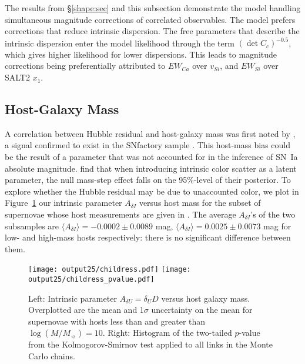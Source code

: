 \documentclass{aastex61}   	%
\begin{document}
The results from  \S\ref{shape:sec} and this subsection demonstrate the model handling simultaneous
magnitude corrections 
of  correlated observables.  The model prefers corrections that reduce intrinsic dispersion.
The free parameters that describe the intrinsic dispersion enter the model likelihood through  the term $(\det{C_c})^{-0.5}$, which gives higher likelihood 
for lower dispersions. This leads to magnitude corrections being preferentially
attributed to $EW_{Ca}$ over $v_{Si}$, and  $EW_{Si}$ over SALT2 $x_1$.



\subsection{Host-Galaxy Mass}
A correlation between Hubble residual and host-galaxy mass
was first noted by \citet{2010ApJ...715..743K,2010MNRAS.406..782S}, a signal confirmed to exist in the SNfactory
sample \citep{2013ApJ...770..108C}.
This host-mass bias could be the result of a parameter that was not accounted for in the inference of SN~Ia absolute magnitude.
\citet{2017ApJ...842...93M} find that when introducing intrinsic color scatter as a latent parameter, the null mass-step effect falls on the 95\%-level of their posterior.
To explore whether the Hubble residual may be due to unaccounted color,
we plot in Figure~\ref{childress:fig} our intrinsic parameter  $A_{\delta I}$  versus host mass 
for the subset of supernovae whose host measurements are given in \citet{2013ApJ...770..108C}.
The average $A_{\delta I}$'s of the two subsamples are
$\langle A_{\delta I} \rangle=     -0.0002 \pm    0.0089$ mag,
$\langle A_{\delta I} \rangle= 0.0025 \pm   0.0073 $ mag
for low- and high-mass hosts respectively: there is no significant difference between them. 


\begin{figure}[htbp] %
   \centering
   \texttt{[image: output25/childress.pdf]}
   \texttt{[image: output25/childress\_pvalue.pdf]}
      \caption{Left: Intrinsic parameter $A_{\delta U}=\delta_U D$  versus host galaxy mass. Overplotted are the mean and 1$\sigma$ uncertainty on the mean for supernovae with hosts
      less than and greater than  $\log{(M/M_\sun)}=10$.
Right: Histogram of the two-tailed $p$-value from  the Kolmogorov-Smirnov test applied to all links in the Monte Carlo chains.
   \label{childress:fig}}
\end{figure}
\end{document}
